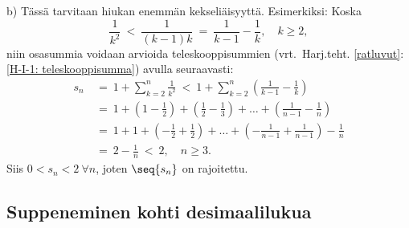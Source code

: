 b) Tässä tarvitaan hiukan enemmän kekseliäisyyttä. Esimerkiksi: Koska
\[
\frac{1}{k^2}\ <\ \frac{1}{(k-1)k}\ =\ \frac{1}{k-1} - \frac{1}{k}, \quad k \ge 2,
\]
niin osasummia voidaan arvioida teleskooppisummien 
(vrt.\ Harj.teht. \ref{ratluvut}:\ref{H-I-1: teleskooppisumma}) avulla seuraavasti:
\begin{align*}
s_n\ &=\ 1 + \sum_{k=2}^n \frac{1}{k^2}\ 
      <\ 1 + \sum_{k=2}^n \left( \frac{1}{k-1} - \frac{1}{k} \right) \\
     &=\ 1 + \left(1 - \frac{1}{2}\right) 
           + \left(\frac{1}{2} - \frac{1}{3}\right) + \ldots
           + \left(\frac{1}{n-1} - \frac{1}{n}\right)         \\
     &=\ 1 + 1 + \left(- \frac{1}{2} + \frac{1}{2}\right) + \ldots 
      + \left(- \frac{1}{n-1} + \frac{1}{n-1}\right) - \frac{1}{n} \\
     &=\ 2 - \frac{1}{n}\ <\ 2, \quad n \ge 3.
\end{align*}
Siis $0 < s_n < 2\ \forall n$, joten $\seq{s_n}$ on rajoitettu. \loppu

\subsection*{Suppeneminen kohti desimaalilukua}


